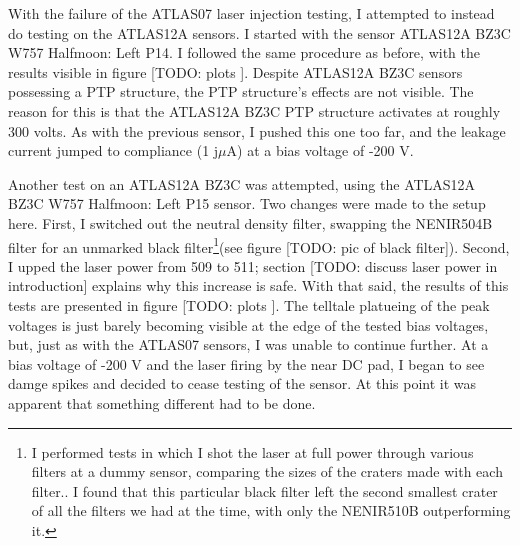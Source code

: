 \documentclass{report}
\begin{document}
            With the failure of the ATLAS07 laser injection testing, I attempted to instead do testing on the ATLAS12A sensors. I started with the sensor ATLAS12A BZ3C W757 Halfmoon: Left P14. I followed the same procedure as before, with the results visible in figure [TODO: plots
            ]. Despite ATLAS12A BZ3C sensors possessing a PTP structure, the PTP structure's effects are not visible. The reason for this is that the ATLAS12A BZ3C PTP structure activates at roughly 300 volts. As with the previous sensor, I pushed this one too far, and the leakage current jumped to compliance (1 j$\mu$A) at a bias voltage of -200 V.

            Another test on an ATLAS12A BZ3C was attempted, using the ATLAS12A BZ3C W757 Halfmoon: Left P15 sensor. Two changes were made to the setup here. First, I switched out the neutral density filter, swapping the NENIR504B filter for an unmarked black filter\footnote{I performed tests in which I shot the laser at full power through various filters at a dummy sensor, comparing the sizes of the craters made with each filter.. I found that this particular black filter left the second smallest crater of all the filters we had at the time, with only the NENIR510B outperforming it.}(see figure [TODO: pic of black filter]). Second, I upped the laser power from 509 to 511; section [TODO: discuss laser power in introduction] explains why this increase is safe. With that said, the results of this tests are presented in figure [TODO: plots
            ]. The telltale platueing of the peak voltages is just barely becoming visible at the edge of the tested bias voltages, but, just as with the ATLAS07 sensors, I was unable to continue further. At a bias voltage of -200 V and the laser firing by the near DC pad, I began to see damge spikes and decided to cease testing of the sensor. At this point it was apparent that something different had to be done.
            
\end{document}
